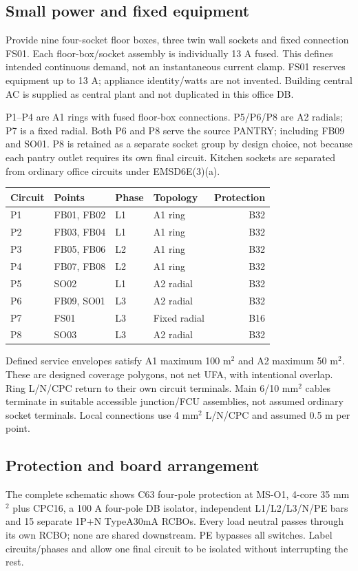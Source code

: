 \subsection*{Small power and fixed equipment}
Provide nine four-socket floor boxes, three twin wall sockets and fixed connection FS01. Each floor-box/socket assembly is individually 13 A fused. This defines intended continuous demand, not an instantaneous current clamp. FS01 reserves equipment up to 13 A;  appliance identity/watts are not invented. Building central AC is supplied as central plant and not duplicated in this office DB.

P1--P4 are A1 rings with fused floor-box connections. P5/P6/P8 are A2 radials;  P7 is a fixed radial. Both P6 and P8 serve the source PANTRY;  including FB09 and SO01. P8 is retained as a separate socket group by design choice, not because each pantry outlet requires its own final circuit. Kitchen sockets are separated from ordinary office circuits under EMSD6E(3)(a).
\begin{center}\begin{tabular}{llllr}\toprule
Circuit & Points & Phase & Topology & Protection\\\midrule

P1 & FB01, FB02 & L1 & A1 ring & B32 \\
P2 & FB03, FB04 & L1 & A1 ring & B32 \\
P3 & FB05, FB06 & L2 & A1 ring & B32 \\
P4 & FB07, FB08 & L2 & A1 ring & B32 \\
P5 & SO02 & L1 & A2 radial & B32 \\
P6 & FB09, SO01 & L3 & A2 radial & B32 \\
P7 & FS01 & L3 & Fixed radial & B16 \\
P8 & SO03 & L3 & A2 radial & B32 \\

\bottomrule\end{tabular}\end{center}
Defined service envelopes satisfy A1 maximum 100 m$^2$ and A2 maximum 50 m$^2$. These are designed coverage polygons, not net UFA, with intentional overlap. Ring L/N/CPC return to their own circuit terminals. Main 6/10 mm$^2$ cables terminate in suitable accessible junction/FCU assemblies, not assumed ordinary socket terminals. Local connections use 4 mm$^2$ L/N/CPC and assumed 0.5 m per point.

\subsection*{Protection and board arrangement}
The complete schematic shows C63 four-pole protection at MS-O1, 4-core 35 mm$^2$ plus CPC16, a 100 A four-pole DB isolator, independent L1/L2/L3/N/PE bars and 15 separate 1P+N TypeA30mA RCBOs. Every load neutral passes through its own RCBO;  none are shared downstream. PE bypasses all switches. Label circuits/phases and allow one final circuit to be isolated without interrupting the rest.

